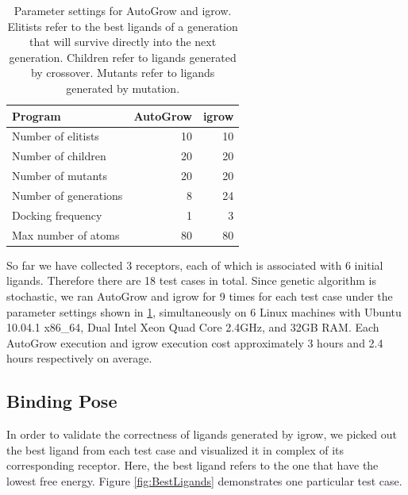 \documentclass[10pt, conference, compsocconf]{../IEEEtran}
\begin{document}
\begin{table}
\centering
\begin{tabular*}
{\linewidth}
{@{\extracolsep{\fill}}lrr}
\noalign{\smallskip}\toprule
Program & AutoGrow & igrow\\
\midrule
\noalign{\smallskip}
Number of elitists & 10 & 10\\
Number of children & 20 & 20\\
Number of mutants & 20 & 20\\
Number of generations & 8 & 24\\
Docking frequency & 1 & 3\\
Max number of atoms & 80 & 80\\
\bottomrule
\end{tabular*}
\caption{Parameter settings for AutoGrow and igrow. Elitists refer to the best ligands of a generation that will survive directly into the next generation. Children refer to ligands generated by crossover. Mutants refer to ligands generated by mutation.}
\label{tab:ParameterSettings}
\end{table}

So far we have collected 3 receptors, each of which is associated with 6 initial ligands. Therefore there are 18 test cases in total. Since genetic algorithm is stochastic, we ran AutoGrow and igrow for 9 times for each test case under the parameter settings shown in \ref{tab:ParameterSettings}, simultaneously on 6 Linux machines with Ubuntu 10.04.1 x86\_64, Dual Intel Xeon Quad Core 2.4GHz, and 32GB RAM. Each AutoGrow execution and igrow execution cost approximately 3 hours and 2.4 hours respectively on average.

\subsection{Binding Pose}

In order to validate the correctness of ligands generated by igrow, we picked out the best ligand from each test case and visualized it in complex of its corresponding receptor. Here, the best ligand refers to the one that have the lowest free energy.
Figure \ref{fig:BestLigands} demonstrates one particular test case.
\end{document}
